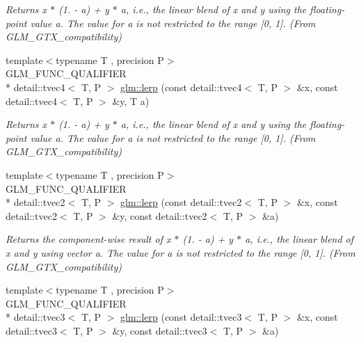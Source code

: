 \begin{DoxyCompactItemize}
\begin{DoxyCompactList}\small\item\em Returns x $\ast$ (1. -\/ a) + y $\ast$ a, i.\-e., the linear blend of x and y using the floating-\/point value a. The value for a is not restricted to the range \mbox{[}0, 1\mbox{]}. (From G\-L\-M\-\_\-\-G\-T\-X\-\_\-compatibility) \end{DoxyCompactList}\item 
\hypertarget{group__gtx__compatibility_ga063de7edddb13ecc44fcfddd9bf38111}{{\footnotesize template$<$typename T , precision P$>$ }\\G\-L\-M\-\_\-\-F\-U\-N\-C\-\_\-\-Q\-U\-A\-L\-I\-F\-I\-E\-R \\*
detail\-::tvec4$<$ T, P $>$ \hyperlink{group__gtx__compatibility_ga063de7edddb13ecc44fcfddd9bf38111}{glm\-::lerp} (const detail\-::tvec4$<$ T, P $>$ \&x, const detail\-::tvec4$<$ T, P $>$ \&y, T a)}\label{group__gtx__compatibility_ga063de7edddb13ecc44fcfddd9bf38111}

\begin{DoxyCompactList}\small\item\em Returns x $\ast$ (1. -\/ a) + y $\ast$ a, i.\-e., the linear blend of x and y using the floating-\/point value a. The value for a is not restricted to the range \mbox{[}0, 1\mbox{]}. (From G\-L\-M\-\_\-\-G\-T\-X\-\_\-compatibility) \end{DoxyCompactList}\item 
\hypertarget{group__gtx__compatibility_ga9cc12766a2675ce054a30b0cab4b567b}{{\footnotesize template$<$typename T , precision P$>$ }\\G\-L\-M\-\_\-\-F\-U\-N\-C\-\_\-\-Q\-U\-A\-L\-I\-F\-I\-E\-R \\*
detail\-::tvec2$<$ T, P $>$ \hyperlink{group__gtx__compatibility_ga9cc12766a2675ce054a30b0cab4b567b}{glm\-::lerp} (const detail\-::tvec2$<$ T, P $>$ \&x, const detail\-::tvec2$<$ T, P $>$ \&y, const detail\-::tvec2$<$ T, P $>$ \&a)}\label{group__gtx__compatibility_ga9cc12766a2675ce054a30b0cab4b567b}

\begin{DoxyCompactList}\small\item\em Returns the component-\/wise result of x $\ast$ (1. -\/ a) + y $\ast$ a, i.\-e., the linear blend of x and y using vector a. The value for a is not restricted to the range \mbox{[}0, 1\mbox{]}. (From G\-L\-M\-\_\-\-G\-T\-X\-\_\-compatibility) \end{DoxyCompactList}\item 
\hypertarget{group__gtx__compatibility_gaa07546447a0138988802c82cf38aa53d}{{\footnotesize template$<$typename T , precision P$>$ }\\G\-L\-M\-\_\-\-F\-U\-N\-C\-\_\-\-Q\-U\-A\-L\-I\-F\-I\-E\-R \\*
detail\-::tvec3$<$ T, P $>$ \hyperlink{group__gtx__compatibility_gaa07546447a0138988802c82cf38aa53d}{glm\-::lerp} (const detail\-::tvec3$<$ T, P $>$ \&x, const detail\-::tvec3$<$ T, P $>$ \&y, const detail\-::tvec3$<$ T, P $>$ \&a)}\label{group__gtx__compatibility_gaa07546447a0138988802c82cf38aa53d}


\end{DoxyCompactItemize}

